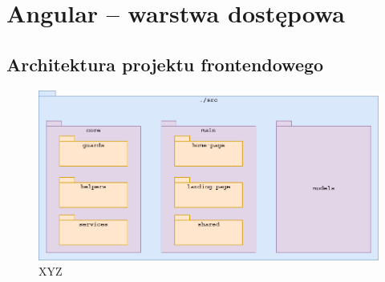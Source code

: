 \newpage
\section{Angular -- warstwa dostępowa}
\subsection{Architektura projektu frontendowego}
\begin{figure}[H]
  \centering
  \includegraphics[width=1\linewidth]{rysunki/angular-arch.png}
  \caption{XYZ}
  \label{fig:xyz}
\end{figure}

